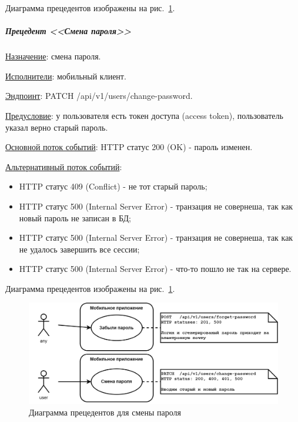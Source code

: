 Диаграмма прецедентов изображены на рис.~\ref{fig:UML_precedent_change_password}.


\subparagraph{Прецедент <<Смена пароля>>} \hspace{0pt}

\underline{Назначение}: смена пароля.

\underline{Исполнители}: мобильный клиент.

\underline{Эндпоинт}: PATCH /api/v1/users/change-password.

\underline{Предусловие}: у пользователя есть токен доступа (access token), пользователь указал верно старый пароль.

\underline{Основной поток событий}: HTTP статус 200 (OK) - пароль изменен. 

\underline{Альтернативный поток событий}:

\begin{itemize}
    \item HTTP статус 409 (Conflict) - не тот старый пароль;
    \item HTTP статус 500 (Internal Server Error) - транзация не совернеша, так как новый пароль не записан в БД;
    \item HTTP статус 500 (Internal Server Error) - транзация не совернеша, так как не удалось завершить все сессии;
    \item HTTP статус 500 (Internal Server Error) - что-то пошло не так на сервере.
\end{itemize}

Диаграмма прецедентов изображены на рис.~\ref{fig:UML_precedent_change_password}.


\begin{figure}[!htb]
    \centering

    \includegraphics[width=18cm]
    {images/UML/UML_precedent_change_password.png}

    \caption{Диаграмма прецедентов для смены пароля}

    \label{fig:UML_precedent_change_password}
\end{figure}

